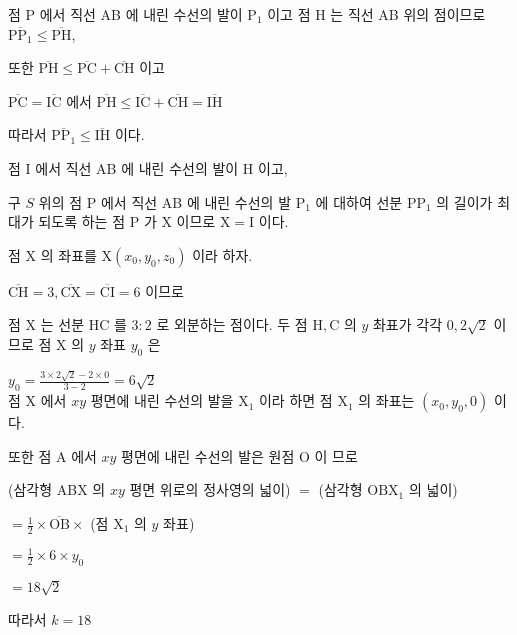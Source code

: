 \documentclass[10pt]{article}
\begin{document}
점 P 에서 직선 AB 에 내린 수선의 발이 \(\mathrm{P}_{1}\) 이고 점 H 는 직선 AB 위의 점이므로 \(\overline{\mathrm{PP}_{1}} \leq \overline{\mathrm{PH}}\),

또한 \(\overline{\mathrm{PH}} \leq \overline{\mathrm{PC}}+\overline{\mathrm{CH}}\) 이고

\(\overline{\mathrm{PC}}=\overline{\mathrm{IC}}\) 에서 \(\overline{\mathrm{PH}} \leq \overline{\mathrm{IC}}+\overline{\mathrm{CH}}=\overline{\mathrm{IH}}\)

따라서 \(\overline{\mathrm{PP}_{1}} \leq \overline{\mathrm{IH}}\) 이다.

점 I 에서 직선 AB 에 내린 수선의 발이 H 이고,

구 \(S\) 위의 점 P 에서 직선 AB 에 내린 수선의 발 \(\mathrm{P}_{1}\) 에 대하여 선분 \(\mathrm{PP}_{1}\) 의 길이가 최대가 되도록 하는 점 P 가 X 이므로 \(\mathrm{X}=\mathrm{I}\) 이다.

점 X 의 좌표를 \(\mathrm{X}\left(x_{0}, y_{0}, z_{0}\right)\) 이라 하자.

\(\overline{\mathrm{CH}}=3, \overline{\mathrm{CX}}=\overline{\mathrm{CI}}=6\) 이므로

점 X 는 선분 HC 를 \(3: 2\) 로 외분하는 점이다. 두 점 \(\mathrm{H}, \mathrm{C}\) 의 \(y\) 촤표가 각각 \(0,2 \sqrt{2}\) 이므로 점 X 의 \(y\) 좌표 \(y_{0}\) 은

\(y_{0}=\frac{3 \times 2 \sqrt{2}-2 \times 0}{3-2}=6 \sqrt{2}\)\\
점 X 에서 \(x y\) 평면에 내린 수선의 발을 \(\mathrm{X}_{1}\) 이라 하면 점 \(\mathrm{X}_{1}\) 의 좌표는 \(\left(x_{0}, y_{0}, 0\right)\) 이다.

또한 점 A 에서 \(x y\) 평면에 내린 수선의 발은 원점 O 이 므로

(삼각형 ABX 의 \(x y\) 평면 위로의 정사영의 넓이) \(=\) (삼각형 \(\mathrm{OBX}_{1}\) 의 넓이)

\(=\frac{1}{2} \times \overline{\mathrm{OB}} \times\) (점 \(\mathrm{X}_{1}\) 의 \(y\) 좌표)

\(=\frac{1}{2} \times 6 \times y_{0}\)

\(=18 \sqrt{2}\)

따라서 \(k=18\)
\end{document}
